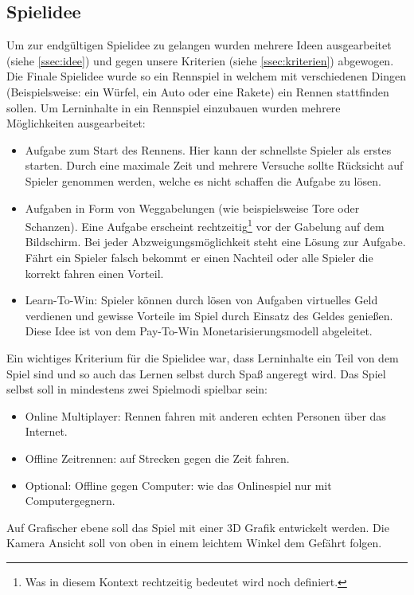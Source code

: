 \subsection{Spielidee}\label{ssec:spielidee}
	Um zur endgültigen Spielidee zu gelangen wurden mehrere Ideen ausgearbeitet (siehe \ref{ssec:idee}) und gegen unsere Kriterien (siehe \ref{ssec:kriterien}) abgewogen.
	Die Finale Spielidee wurde so ein Rennspiel in welchem mit verschiedenen Dingen (Beispielsweise: ein Würfel, ein Auto oder eine Rakete) ein Rennen stattfinden sollen. Um Lerninhalte in ein Rennspiel einzubauen wurden mehrere Möglichkeiten ausgearbeitet:
	\begin{itemize}
		\item{ Aufgabe zum Start des Rennens. Hier kann der schnellste Spieler als erstes starten. Durch eine maximale Zeit und mehrere Versuche sollte Rücksicht auf Spieler genommen werden, welche es nicht schaffen die Aufgabe zu lösen. }
		\item{ Aufgaben in Form von Weggabelungen (wie beispielsweise Tore oder Schanzen). Eine Aufgabe erscheint rechtzeitig\footnote{Was in diesem Kontext rechtzeitig bedeutet wird noch definiert.} vor der Gabelung auf dem Bildschirm. Bei jeder Abzweigungsmöglichkeit steht eine Lösung zur Aufgabe. Fährt ein Spieler falsch  bekommt er einen Nachteil oder alle Spieler die korrekt fahren einen Vorteil. }
		\item{ Learn-To-Win: Spieler können durch lösen von Aufgaben virtuelles Geld verdienen und gewisse Vorteile im Spiel durch Einsatz des Geldes genießen. Diese Idee ist von dem Pay-To-Win Monetarisierungsmodell abgeleitet. }
	\end{itemize}
	Ein wichtiges Kriterium für die Spielidee war, dass Lerninhalte ein Teil von dem Spiel sind und so auch das Lernen selbst durch Spaß angeregt wird.
	Das Spiel selbst soll in mindestens zwei Spielmodi spielbar sein:
	\begin{itemize}
		\item{ Online Multiplayer: Rennen fahren mit anderen echten Personen über das Internet. }
		\item{ Offline Zeitrennen: auf Strecken gegen die Zeit fahren. }
		\item{ Optional: Offline gegen Computer: wie das Onlinespiel nur mit Computergegnern. }
	\end{itemize}
	Auf Grafischer ebene soll das Spiel mit einer 3D Grafik entwickelt werden. Die Kamera Ansicht soll von oben in einem leichtem Winkel dem Gefährt folgen.

